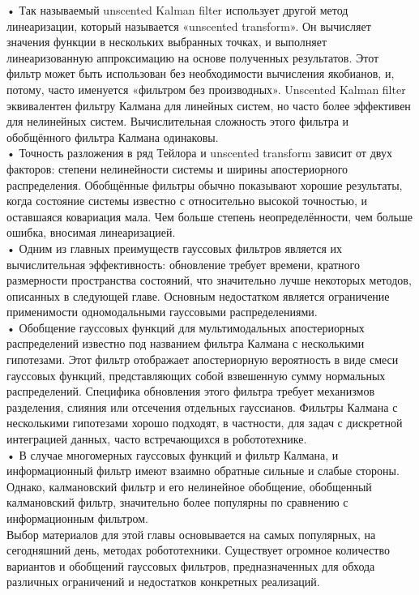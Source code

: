 \documentclass[10pt,a4paper]{article}
\begin{document}
• Так называемый unscented Kalman filter использует другой метод линеаризации, который называется «unscented transform». Он вычисляет значения функции в нескольких выбранных точках, и выполняет линеаризованную аппроксимацию на основе полученных результатов. Этот фильтр может быть использован без необходимости вычисления якобианов, и, потому, часто именуется «фильтром без производных». Unscented Kalman filter эквивалентен фильтру Калмана для линейных систем, но часто более эффективен для нелинейных систем. Вычислительная сложность этого фильтра и обобщённого фильтра Калмана одинаковы.\\

• Точность разложения в ряд Тейлора и unscented transform зависит от двух факторов: степени нелинейности системы и ширины апостериорного распределения. Обобщённые фильтры обычно показывают хорошие результаты, когда состояние системы известно с относительно высокой точностью, и оставшаяся ковариация мала. Чем больше степень неопределённости, чем больше ошибка, вносимая линеаризацией.\\

• Одним из главных преимуществ гауссовых фильтров является их вычислительная эффективность: обновление требует времени, кратного размерности пространства состояний, что значительно лучше некоторых методов, описанных в следующей главе. Основным недостатком является ограничение применимости одномодальными гауссовыми распределениями.\\

• Обобщение гауссовых функций для мультимодальных апостериорных распределений известно под названием фильтра Калмана с несколькими гипотезами. Этот фильтр отображает апостериорную вероятность в виде смеси гауссовых функций, представляющих собой взвешенную сумму нормальных распределений. Специфика обновления этого фильтра требует механизмов разделения, слияния или отсечения отдельных гауссианов. Фильтры Калмана с несколькими гипотезами хорошо подходят, в частности, для задач с дискретной интеграцией данных, часто встречающихся в робототехнике.\\

• В случае многомерных гауссовых функций и фильтр Калмана, и информационный фильтр имеют взаимно обратные сильные и слабые стороны. Однако, калмановский фильтр и его нелинейное обобщение, обобщенный калмановский фильтр, значительно более популярны по сравнению с информационным фильтром.\\

Выбор материалов для этой главы основывается на самых популярных, на сегодняшний день, методах робототехники. Существует огромное количество вариантов и обобщений гауссовых фильтров,  предназначенных для обхода различных ограничений и недостатков конкретных реализаций.
 
\end{document}
